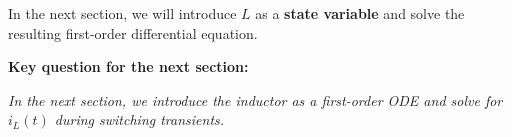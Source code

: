 In the next section, we will introduce $L$ as a \textbf{state variable} and solve the resulting first-order differential equation.

\vspace{1em}
\noindent\textbf{Key question for the next section:}
\begin{center}
\end{center}

\vspace{1em}
\noindent\textit{In the next section, we introduce the inductor as a first-order ODE and solve for $i_L(t)$ during switching transients.}
